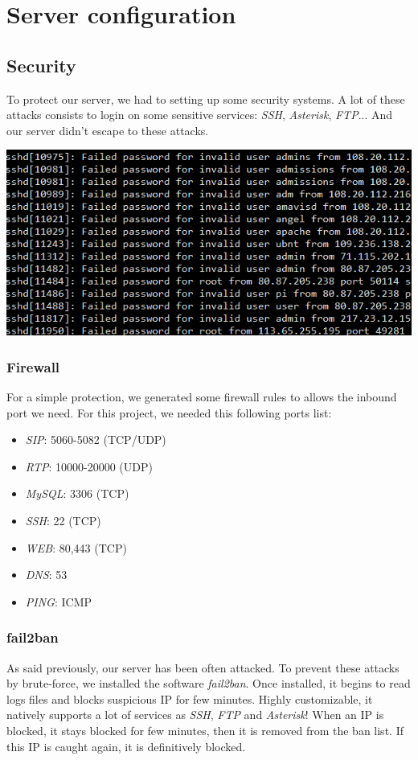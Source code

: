 \chapter{Server configuration}

\section{Security}

To protect our server, we had to setting up some security systems. A lot of these attacks consists to login on some sensitive services: \textit{SSH}, \textit{Asterisk}, \textit{FTP}... And our server didn't escape to these attacks. 

\includegraphics[width=1\textwidth]{img/sshattacks.png}

\subsection{Firewall}

For a simple protection, we generated some firewall rules to allows the inbound port we need. For this project, we needed this following ports list:
\begin{itemize}
\item \textit{SIP}: 5060-5082 (TCP/UDP)	
\item \textit{RTP}: 10000-20000 (UDP)
\item \textit{MySQL}: 3306 (TCP)
\item \textit{SSH}: 22 (TCP)
\item \textit{WEB}: 80,443 (TCP)
\item \textit{DNS}: 53 
\item \textit{PING}: ICMP
\end{itemize}

\subsection{fail2ban}
As said previously, our server has been often attacked. To prevent these attacks by brute-force, we installed the software \textit{fail2ban}. Once installed, it begins to read logs files and blocks suspicious IP for few minutes. Highly customizable, it natively supports a lot of services as \textit{SSH}, \textit{FTP} and \textit{Asterisk}! 
When an IP is blocked, it stays blocked for few minutes, then it is removed from the ban list. If this IP is caught again, it is definitively blocked.


